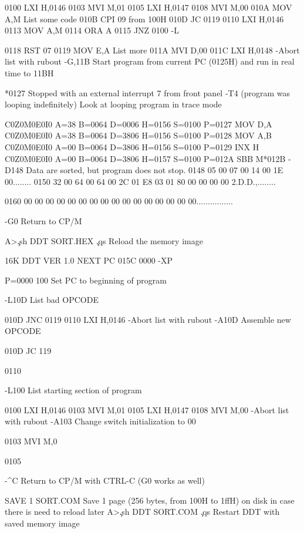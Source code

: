  0100   LXI H,0146
 0103   MVI M,01
 0105   LXI H,0147
 0108   MVI M,00
 010A   MOV A,M        List some code
 010B   CPI 09         from 100H
 010D   JC  0119
 0110   LXI H,0146
 0113   MOV A,M
 0114   ORA A
 0115   JNZ 0100
 -L

 0118   RST 07
 0119   MOV E,A        List more
 011A   MVI D,00
 011C   LXI H,0148
-Abort list with rubout
-G,11B    Start program from current PC (0125H)
          and run in real time to 11BH



*0127   Stopped with an external interrupt 7 from front panel
-T4                        (program was looping indefinitely)
      Look at looping program in trace mode

C0Z0M0E0I0 A=38 B=0064 D=0006 H=0156 S=0100 P=0127 MOV D,A
C0Z0M0E0I0 A=38 B=0064 D=3806 H=0156 S=0100 P=0128 MOV A,B
C0Z0M0E0I0 A=00 B=0064 D=3806 H=0156 S=0100 P=0129 INX H
C0Z0M0E0I0 A=00 B=0064 D=3806 H=0157 S=0100 P=012A SBB M*012B
-D148
                        Data are sorted, but program does not stop.
0148 05 00 07 00 14 00 1E 00........
0150 32 00 64 00 64 00 2C 01 E8 03 01 80 00 00 00 00 2.D.D.,........

0160 00 00 00 00 00 00 00 00 00 00 00 00 00 00 00 00................

-G0    Return to CP/M

A>\c
.sh
DDT SORT.HEX    \c
.qs
Reload the memory image

16K DDT VER 1.0
NEXT PC
015C 0000
-XP

P=0000 100    Set PC to beginning of program

-L10D   List bad OPCODE

 010D   JNC 0119
 0110   LXI H,0146
-Abort list with rubout
-A10D    Assemble new OPCODE

010D JC 119

0110

-L100   List starting section of program

 0100   LXI H,0146
 0103   MVI M,01
 0105   LXI H,0147
 0108   MVI M,00
-Abort list with rubout
-A103    Change switch initialization to 00

0103 MVI M,0

0105

-^C  Return to CP/M with CTRL-C (G0 works as well)

SAVE 1 SORT.COM     Save 1 page (256 bytes, from 100H to 1ffH) on
                    disk in case there is need to reload later
A>\c
.sh
DDT SORT.COM      \c
.qs
Restart DDT with saved memory image

